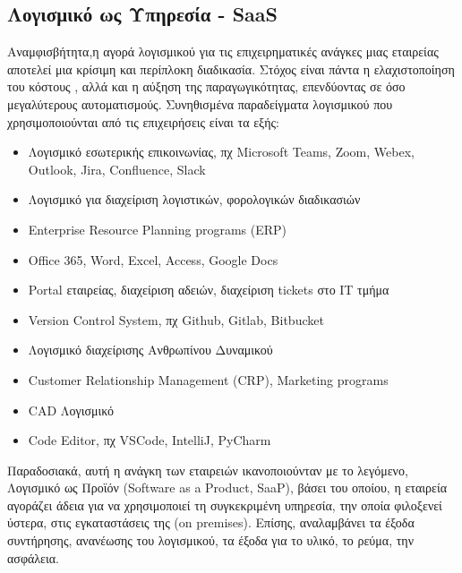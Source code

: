 \documentclass{article}
\begin{document}
\subsection{Λογισμικό ως Υπηρεσία - SaaS}
Αναμφισβήτητα,η αγορά λογισμικού για τις επιχειρηματικές ανάγκες μιας εταιρείας αποτελεί μια κρίσιμη και περίπλοκη διαδικασία. Στόχος είναι πάντα η ελαχιστοποίηση του κόστους , αλλά και η αύξηση της παραγωγικότητας, επενδύοντας σε όσο μεγαλύτερους αυτοματισμούς. Συνηθισμένα παραδείγματα λογισμικού που χρησιμοποιούνται από τις επιχειρήσεις είναι τα εξής:
\begin{itemize}
  \item Λογισμικό εσωτερικής επικοινωνίας, πχ  Microsoft Teams, Zoom, Webex, Outlook, Jira, Confluence, Slack
  \item Λογισμικό για διαχείριση λογιστικών, φορολογικών διαδικασιών
  \item {} Enterprise Resource Planning programs (ERP)
  \item Office 365, Word, Excel, Access, Google Docs
  \item Portal  εταιρείας, διαχείριση αδειών, διαχείριση tickets στο ΙΤ τμήμα 
  \item Version Control System, πχ Github, Gitlab, Bitbucket 
  \item Λογισμικό διαχείρισης Ανθρωπίνου Δυναμικού 
  \item Customer Relationship Management (CRP), Marketing programs
  \item CAD Λογισμικό
  \item Code Editor, πχ VSCode, IntelliJ, PyCharm
\end{itemize}
Παραδοσιακά, αυτή η ανάγκη των εταιρειών ικανοποιούνταν με το λεγόμενο, Λογισμικό ως Προϊόν (Software as a Product, SaaP), βάσει του οποίου, η εταιρεία αγοράζει άδεια για να χρησιμοποιεί τη συγκεκριμένη υπηρεσία, την οποία φιλοξενεί ύστερα, στις εγκαταστάσεις της (on premises). Επίσης, αναλαμβάνει τα έξοδα συντήρησης, ανανέωσης του λογισμικού, τα έξοδα για το υλικό, το ρεύμα, την ασφάλεια. \\ \\
\end{document}
